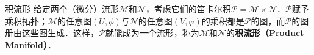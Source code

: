 \begin{definition}{积流形}
给定两个（微分）流形$\mathcal{M}$和$\mathcal{N}$，考虑它们的笛卡尔积$\mathcal{P}=\mathcal{M}\times\mathcal{N}$．$\mathcal{P}$赋予乘积拓扑；$\mathcal{M}$的任意图$(U, \phi)$与$\mathcal{N}$的任意图$(V, \varphi)$的乘积都是$\mathcal{P}$的图，而$\mathcal{P}$的图册由这些图生成．这样，$\mathcal{P}$就能成为一个流形，称为$\mathcal{M}$和$\mathcal{N}$的\textbf{积流形（Product Manifold）}．
\end{definition}
